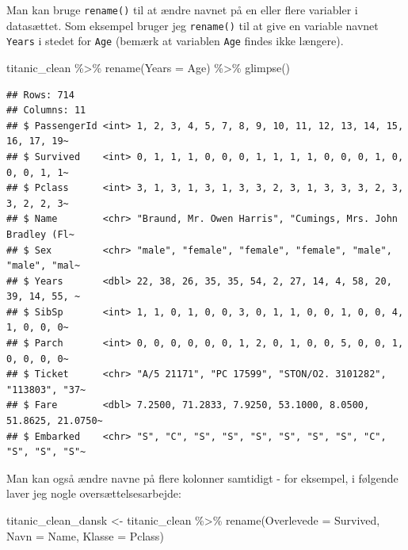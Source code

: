 \documentclass[
]{book}
\newenvironment{Shaded}{\begin{snugshade}}{\end{snugshade}}
\newcommand{\AttributeTok}[1]{\textcolor[rgb]{0.77,0.63,0.00}{#1}}
\newcommand{\FunctionTok}[1]{\textcolor[rgb]{0.00,0.00,0.00}{#1}}
\newcommand{\NormalTok}[1]{#1}
\newcommand{\OtherTok}[1]{\textcolor[rgb]{0.56,0.35,0.01}{#1}}
\newcommand{\SpecialCharTok}[1]{\textcolor[rgb]{0.00,0.00,0.00}{#1}}
\begin{document}
Man kan bruge \texttt{rename()} til at ændre navnet på en eller flere variabler i datasættet. Som eksempel bruger jeg \texttt{rename()} til at give en variable navnet \texttt{Years} i stedet for \texttt{Age} (bemærk at variablen \texttt{Age} findes ikke længere).

\begin{Shaded}
\begin{Highlighting}[]
\NormalTok{titanic\_clean }\SpecialCharTok{\%\textgreater{}\%}
  \FunctionTok{rename}\NormalTok{(}\AttributeTok{Years =}\NormalTok{ Age) }\SpecialCharTok{\%\textgreater{}\%}
  \FunctionTok{glimpse}\NormalTok{()}
\end{Highlighting}
\end{Shaded}

\begin{verbatim}
## Rows: 714
## Columns: 11
## $ PassengerId <int> 1, 2, 3, 4, 5, 7, 8, 9, 10, 11, 12, 13, 14, 15, 16, 17, 19~
## $ Survived    <int> 0, 1, 1, 1, 0, 0, 0, 1, 1, 1, 1, 0, 0, 0, 1, 0, 0, 0, 1, 1~
## $ Pclass      <int> 3, 1, 3, 1, 3, 1, 3, 3, 2, 3, 1, 3, 3, 3, 2, 3, 3, 2, 2, 3~
## $ Name        <chr> "Braund, Mr. Owen Harris", "Cumings, Mrs. John Bradley (Fl~
## $ Sex         <chr> "male", "female", "female", "female", "male", "male", "mal~
## $ Years       <dbl> 22, 38, 26, 35, 35, 54, 2, 27, 14, 4, 58, 20, 39, 14, 55, ~
## $ SibSp       <int> 1, 1, 0, 1, 0, 0, 3, 0, 1, 1, 0, 0, 1, 0, 0, 4, 1, 0, 0, 0~
## $ Parch       <int> 0, 0, 0, 0, 0, 0, 1, 2, 0, 1, 0, 0, 5, 0, 0, 1, 0, 0, 0, 0~
## $ Ticket      <chr> "A/5 21171", "PC 17599", "STON/O2. 3101282", "113803", "37~
## $ Fare        <dbl> 7.2500, 71.2833, 7.9250, 53.1000, 8.0500, 51.8625, 21.0750~
## $ Embarked    <chr> "S", "C", "S", "S", "S", "S", "S", "S", "C", "S", "S", "S"~
\end{verbatim}

Man kan også ændre navne på flere kolonner samtidigt - for eksempel, i følgende laver jeg nogle oversættelsesarbejde:

\begin{Shaded}
\begin{Highlighting}[]
\NormalTok{titanic\_clean\_dansk }\OtherTok{\textless{}{-}}\NormalTok{ titanic\_clean }\SpecialCharTok{\%\textgreater{}\%}
  \FunctionTok{rename}\NormalTok{(}\AttributeTok{Overlevede =}\NormalTok{ Survived,}
         \AttributeTok{Navn =}\NormalTok{ Name,}
         \AttributeTok{Klasse =}\NormalTok{ Pclass)}
\end{Highlighting}
\end{Shaded}
\end{document}
